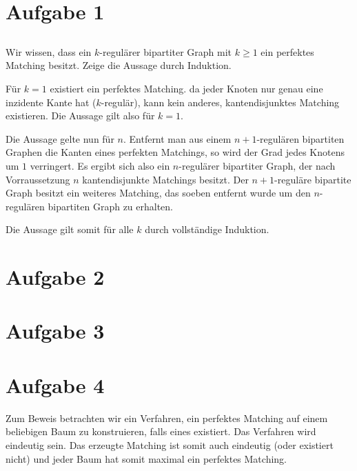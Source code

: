 \documentclass[a4paper]{article}
\begin{document}
\section{Aufgabe 1}
\subsection{}


\subsection{}
Wir wissen, dass ein $k$-regulärer bipartiter Graph mit $k \geq 1$ ein perfektes
Matching besitzt. Zeige die Aussage durch Induktion.

Für $k = 1$ existiert ein perfektes Matching. da jeder Knoten nur genau eine
inzidente Kante hat ($k$-regulär), kann kein anderes, kantendisjunktes
Matching existieren. Die Aussage gilt also für $k = 1$.

Die Aussage gelte nun für $n$.
Entfernt man aus einem $n+1$-regulären bipartiten Graphen die Kanten eines perfekten
Matchings, so wird der Grad jedes Knotens um $1$ verringert. Es ergibt sich
also ein $n$-regulärer bipartiter Graph, der nach Vorraussetzung $n$ kantendisjunkte
Matchings besitzt. Der $n+1$-reguläre bipartite Graph besitzt ein weiteres Matching,
das soeben entfernt wurde um den $n$-regulären bipartiten Graph zu erhalten.

Die Aussage gilt somit für alle $k$ durch vollständige Induktion.

\subsection{}

\section{Aufgabe 2}
\section{Aufgabe 3}

\section{Aufgabe 4}

Zum Beweis betrachten wir ein Verfahren, ein perfektes Matching auf einem
beliebigen Baum zu konstruieren, falls eines existiert. Das Verfahren wird
eindeutig sein. Das erzeugte Matching ist somit auch eindeutig (oder 
existiert nicht) und jeder Baum hat somit maximal ein perfektes Matching.
\end{document}
